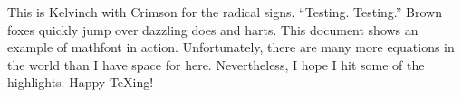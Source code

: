 \documentclass[12pt]{article}
\begin{document}
\def\footnote#1{}
\def\showabstract{0}
\let\textsf\relax
\let\ttfamily\relax
\def\documentname{Example---Kelvinch}



This is Kelvinch with Crimson for the radical signs. ``Testing. Testing.'' Brown foxes quickly jump over dazzling does and harts. This document shows an example of mathfont in action. Unfortunately, there are many more equations in the world than I have space for here. Nevertheless, I hope I hit some of the highlights. Happy \TeX ing!


\end{document}
